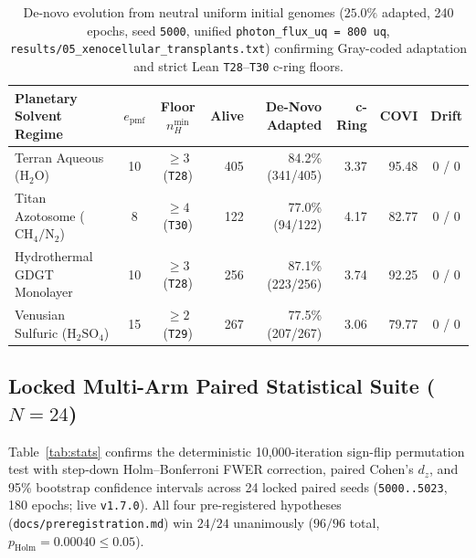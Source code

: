 \documentclass[11pt,reqno]{amsart}
\theoremstyle{plain}
\theoremstyle{definition}
\theoremstyle{remark}
\newcommand{\code}[1]{{\footnotesize\nolinkurl{#1}}}
\begin{document}
\begin{table}[ht]
\centering
\caption{De-novo evolution from neutral uniform initial genomes ($25.0\%$ adapted, 240 epochs, seed \texttt{5000}, unified \code{photon_flux_uq = 800 uq}, \code{results/05_xenocellular_transplants.txt}) confirming Gray-coded adaptation and strict Lean \texttt{T28}--\texttt{T30} c-ring floors.}
\label{tab:solvents}
\scriptsize
\setlength{\tabcolsep}{4pt}
\begin{tabular}{@{} l c c r r r r c @{}}
\toprule
\textbf{Planetary Solvent Regime} & $e_{\mathrm{pmf}}$ & \textbf{Floor $n_H^{\min}$} & \textbf{Alive} & \textbf{De-Novo Adapted} & \textbf{c-Ring} & \textbf{COVI} & \textbf{Drift} \\
\midrule
Terran Aqueous ($\mathrm{H}_2\mathrm{O}$)        & 10 & $\ge 3$ (\texttt{T28}) & 405 & 84.2\% (341/405) & 3.37 & 95.48 & 0 / 0 \\
Titan Azotosome ($\mathrm{CH}_4/\mathrm{N}_2$)   &  8 & $\ge 4$ (\texttt{T30}) & 122 & 77.0\% (94/122)  & 4.17 & 82.77 & 0 / 0 \\
Hydrothermal GDGT Monolayer                      & 10 & $\ge 3$ (\texttt{T28}) & 256 & 87.1\% (223/256) & 3.74 & 92.25 & 0 / 0 \\
Venusian Sulfuric ($\mathrm{H}_2\mathrm{SO}_4$)  & 15 & $\ge 2$ (\texttt{T29}) & 267 & 77.5\% (207/267) & 3.06 & 79.77 & 0 / 0 \\
\bottomrule
\end{tabular}
\end{table}

\subsection{Locked Multi-Arm Paired Statistical Suite (\texorpdfstring{$N = 24$}{N = 24})}
Table~\ref{tab:stats} confirms the deterministic 10,000-iteration sign-flip permutation test with step-down Holm--Bonferroni FWER correction, paired Cohen's $d_z$, and 95\% bootstrap confidence intervals across 24 locked paired seeds (\code{5000..5023}, 180 epochs; live \texttt{v1.7.0}). All four pre-registered hypotheses (\code{docs/preregistration.md}) win $24/24$ unanimously ($96/96$ total, $p_{\mathrm{Holm}} = 0.00040 \le 0.05$).
\end{document}
